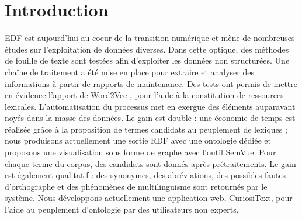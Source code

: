 \section{Introduction}

EDF est aujourd’hui au coeur de la transition numérique et mène de nombreuses études sur  l’exploitation de données diverses. Dans cette optique, des méthodes de fouille de texte sont testées afin d’exploiter les données non structurées. Une chaîne de traitement a été mise en place pour extraire et analyser des informations à partir de rapports de maintenance. Des tests ont permis de mettre en évidence l’apport de Word2Vec \cite{DBLP:journals/corr/abs-1301-3781}, pour l’aide à la constitution de ressources lexicales. L’automatisation du processus met en exergue des éléments auparavant noyés dans la masse des données. Le gain est double : une économie de temps est réalisée grâce à la proposition de termes candidats au peuplement de lexiques ; nous produisons actuellement une sortie RDF avec une ontologie dédiée et proposons une visualisation sous forme de graphe avec l’outil SemVue. Pour chaque terme du corpus, des candidats sont donnés après prétraitements. Le gain est également qualitatif : des synonymes, des abréviations, des possibles fautes d’orthographe et des phénomènes de multilinguisme sont retournés par le système. Nous développons actuellement une application web, CuriosiText, pour l’aide au peuplement d’ontologie par des utilisateurs non experts.
